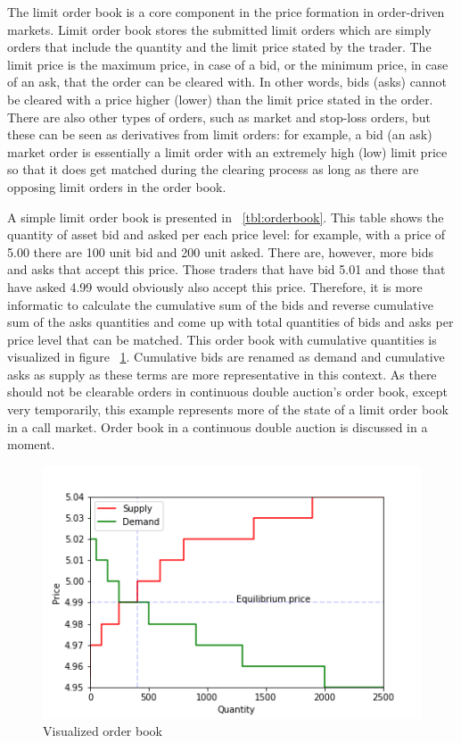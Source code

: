 The limit order book is a core component in the price formation in order-driven markets.
Limit order book stores the submitted limit orders which are simply orders that include the quantity and 
the limit price stated by the trader. The limit price is the maximum price, in case of a bid, or the minimum
price, in case of an ask, that the order can be cleared with. In other words,
bids (asks) cannot be cleared with a price higher (lower) than the limit price stated 
in the order. There are also other types of orders, such as market and 
stop-loss orders, but these can be seen as derivatives from limit orders: 
for example, a bid (an ask) market order is essentially a limit order 
with an extremely high (low) limit price so that it does get matched 
during the clearing process as long as there are opposing limit orders in the 
order book. \citep{lob13} %

A simple limit order book is presented in ~\ref{tbl:orderbook}. This table shows the
quantity of asset bid and asked per each price level: for example, with a price of 5.00
there are 100 unit bid and 200 unit asked. There are, however, more bids and asks that 
accept this price. Those traders that have bid 5.01 and those that have asked 4.99 would obviously also accept
this price. Therefore, it is more informatic to calculate the cumulative sum of the bids and reverse cumulative sum of 
the asks quantities and come up with total quantities of bids and asks per price level that can be matched.  
This order book with cumulative quantities is visualized in figure ~\ref{fig:lob_visual}. Cumulative bids
are renamed as demand and cumulative asks as supply as these terms are more representative in this context.
As there should not be clearable orders in continuous double auction's order book, except very temporarily, 
this example represents more of the state of a limit order book in a call market. Order book
in a continuous double auction is discussed in a moment.

\begin{figure}[H]
    \begin{center}  
        \includegraphics{plots/orderbook_visualized.png}
        \caption{Visualized order book}
        \label{fig:lob_visual}
    \end{center}
\end{figure}

